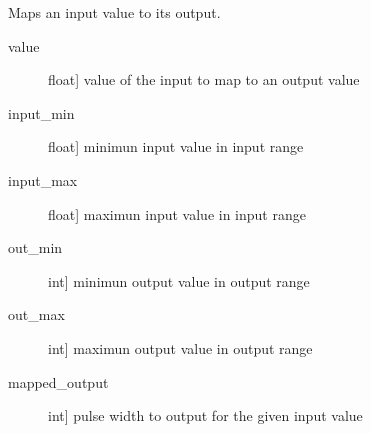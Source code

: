 \documentclass[letterpaper,10pt,english]{sphinxmanual}
\begin{document}
\begin{fulllineitems}
\begin{fulllineitems}
\begin{description}
\end{description}

\end{fulllineitems}


\begin{fulllineitems}
\label{\detokenize{specific:SideLipOutput.SideLipOutput.map_values}}
\sphinxAtStartPar
Maps an input value to its output.

\sphinxAtStartPar
{}
\begin{description}
\item[{value}] \leavevmode{[}float{]}
\sphinxAtStartPar
value of the input to map to an output value

\item[{input\_min}] \leavevmode{[}float{]}
\sphinxAtStartPar
minimun input value in input range

\item[{input\_max}] \leavevmode{[}float{]}
\sphinxAtStartPar
maximun input value in input range

\item[{out\_min}] \leavevmode{[}int{]}
\sphinxAtStartPar
minimun output value in output range

\item[{out\_max}] \leavevmode{[}int{]}
\sphinxAtStartPar
maximun output value in output range

\end{description}

\sphinxAtStartPar
{}
\begin{description}
\item[{mapped\_output}] \leavevmode{[}int{]}
\sphinxAtStartPar
pulse width to output for the given input value

\end{description}

\end{fulllineitems}



\end{fulllineitems}
\end{document}
